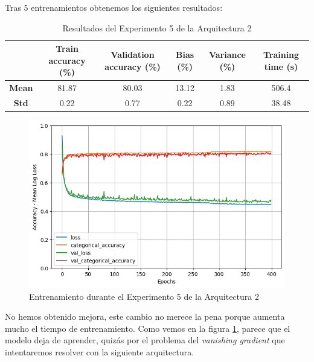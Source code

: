 \documentclass{article}
\begin{document}
			Tras 5 entrenamientos obtenemos los siguientes resultados:
			
			\begin{table}[!h]
				\begin{center}
					\begin{tabular}{ c | c | c | c | c | c |}
						\ & \textbf{Train accuracy (\%)} & \textbf{Validation accuracy (\%)} & \textbf{Bias (\%)} & \textbf{Variance (\%)} & \textbf{Training time (s)} \\ \hline
						\textbf{Mean} & 81.87 & 80.03 & 13.12 & 1.83 & 506.4 \\ \hline
						\textbf{Std} & 0.22 & 0.77 & 0.22 & 0.89 & 38.48 \\ \hline
					\end{tabular}
					\caption{Resultados del Experimento 5 de la Arquitectura 2}
					\label{tab:res-d-a2-e5}
				\end{center}
			\end{table}
			
			\begin{figure}[!h]
				\begin{center}
					\includegraphics[scale=0.5]{d-tr-a2-e5.png}		
					\caption{Entrenamiento durante el Experimento 5 de la Arquitectura 2}	
					\label{d-tr-a2-e5}
				\end{center}
			\end{figure}
			
			\newpage
			No hemos obtenido mejora, este cambio no merece la pena porque aumenta mucho el tiempo de entrenamiento. Como vemos en la figura \ref{d-tr-a2-e5}, parece que el modelo deja de aprender, quiz\'as por el problema del \textit{vanishing gradient} que intentaremos resolver con la siguiente arquitectura.
		
\end{document}
